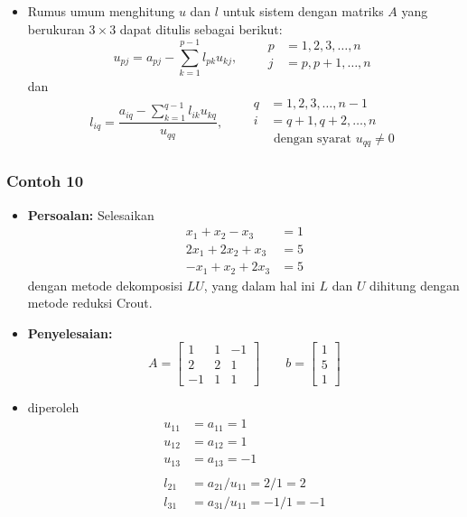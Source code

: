 \documentclass[pdflatex,compress,mathserif]{beamer}
\begin{document}
\begin{frame}
	\begin{itemize}
		\item Rumus umum menghitung $ u $ dan $ l $ untuk sistem dengan matriks $ A $ yang berukuran $ 3 \times 3 $ dapat ditulis sebagai berikut:
		\[ u_{pj} = a_{pj} - \sum_{k=1}^{p-1}l_{pk}u_{kj},\qquad
		\begin{matrix}
			p &= 1,2,3,\dots,n \\
			j &= p,p+1,\dots,n \\
		\end{matrix} \]
		dan
		\[ l_{iq} = \frac{a_{iq} - \sum_{k=1}^{q-1}l_{ik}u_{kq}}{u_{qq}},\qquad
		\begin{matrix}
		q &= 1,2,3,\dots,n-1 \\
		i &= q+1,q+2,\dots,n \\
		&\text{ dengan syarat } u_{qq} \neq 0
		\end{matrix} \]
	\end{itemize}
\end{frame}

\begin{frame}
	\frametitle{Contoh 10}
	\begin{itemize}
		\item \textbf{Persoalan:} Selesaikan
		\begin{align*}
			x_1 + x_2 - x_3 &= 1 \\
			2x_1 + 2x_2 + x_3 &= 5 \\
			-x_1 + x_2 + 2x_3 &= 5
		\end{align*}
		dengan metode dekomposisi $ LU $, yang dalam hal ini $ L $ dan $ U $ dihitung dengan metode reduksi Crout.
	\end{itemize}
\end{frame}

\begin{frame}
	\begin{itemize}
		\item \textbf{Penyelesaian:}
		\[ A = \begin{bmatrix}
		1 & 1 & -1 \\ 2 & 2 & 1 \\ -1 & 1 & 1
		\end{bmatrix}\qquad b = \begin{bmatrix}
		1 \\ 5 \\ 1
		\end{bmatrix} \]
		\item[] diperoleh
		\begin{align*}
			u_{11} &= a_{11} = 1 \\
			u_{12} &= a_{12} = 1 \\
			u_{13} &= a_{13} = -1 \\
			\\
			l_{21} &= a_{21}/u_{11} = 2/1 = 2 \\
			l_{31} &= a_{31}/u_{11} = -1/1 = -1 \\
		\end{align*}
	\end{itemize}
\end{frame}
\end{document}
